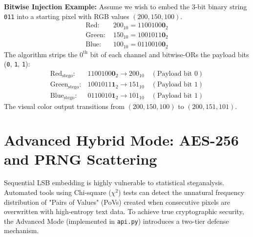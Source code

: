 \documentclass[12pt,a4paper]{report}
\begin{document}
\textbf{Bitwise Injection Example:}
Assume we wish to embed the 3-bit binary string \texttt{011} into a starting pixel with RGB values $(200, 150, 100)$. 
\begin{align*}
    \text{Red: }   & 200_{10} = 1100100\mathbf{0}_2 \\
    \text{Green: } & 150_{10} = 1001011\mathbf{0}_2 \\
    \text{Blue: }  & 100_{10} = 0110010\mathbf{0}_2 
\end{align*}
The algorithm strips the $0^{\text{th}}$ bit of each channel and bitwise-ORs the payload bits (\texttt{0}, \texttt{1}, \texttt{1}):
\begin{align*}
    \text{Red}_{\text{stego}}:   & 1100100\mathbf{0}_2 \rightarrow 200_{10} \quad (\text{Payload bit } 0) \\
    \text{Green}_{\text{stego}}: & 1001011\mathbf{1}_2 \rightarrow 151_{10} \quad (\text{Payload bit } 1) \\
    \text{Blue}_{\text{stego}}:  & 0110010\mathbf{1}_2 \rightarrow 101_{10} \quad (\text{Payload bit } 1)
\end{align*}
The visual color output transitions from $(200, 150, 100)$ to $(200, 151, 101)$.

\section{Advanced Hybrid Mode: AES-256 and PRNG Scattering}
Sequential LSB embedding is highly vulnerable to statistical steganalysis. Automated tools using Chi-square ($\chi^2$) tests can detect the unnatural frequency distribution of "Pairs of Values" (PoVs) created when consecutive pixels are overwritten with high-entropy text data. To achieve true cryptographic security, the Advanced Mode (implemented in \texttt{api.py}) introduces a two-tier defense mechanism.
\end{document}
